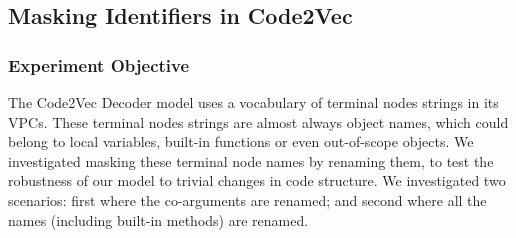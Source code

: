 




\subsection{Masking Identifiers in Code2Vec} %
\label{sub:comparing_code2vec_altered}

\subsubsection{Experiment Objective} %

The Code2Vec Decoder model uses a vocabulary of terminal nodes strings in its VPCs. 
These terminal nodes strings are almost always object names, which could belong to local variables, built-in functions or even out-of-scope objects. 
We investigated masking these terminal node names by renaming them, to test the robustness of our model to trivial changes in  code structure. 
We investigated two scenarios: first where the co-arguments are renamed; and second where all the names (including built-in methods) are renamed.



